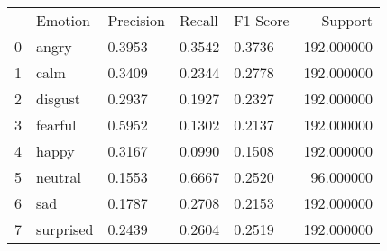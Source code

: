 \begin{tabular}{lllllr}
 & Emotion & Precision & Recall & F1 Score & Support \\
0 & angry & 0.3953 & 0.3542 & 0.3736 & 192.000000 \\
1 & calm & 0.3409 & 0.2344 & 0.2778 & 192.000000 \\
2 & disgust & 0.2937 & 0.1927 & 0.2327 & 192.000000 \\
3 & fearful & 0.5952 & 0.1302 & 0.2137 & 192.000000 \\
4 & happy & 0.3167 & 0.0990 & 0.1508 & 192.000000 \\
5 & neutral & 0.1553 & 0.6667 & 0.2520 & 96.000000 \\
6 & sad & 0.1787 & 0.2708 & 0.2153 & 192.000000 \\
7 & surprised & 0.2439 & 0.2604 & 0.2519 & 192.000000 \\
\end{tabular}
